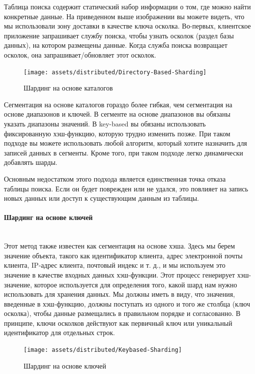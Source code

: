 Таблица поиска содержит статический набор информации о том, где можно найти конкретные данные. На приведенном выше
изображении вы можете видеть, что мы использовали зону доставки в качестве ключа осколка. Во-первых, клиентское
приложение запрашивает службу поиска, чтобы узнать осколок (раздел базы данных), на котором размещены данные. Когда
служба поиска возвращает осколок, она запрашивает/обновляет этот осколок.

\begin{figure}[H]
    \centering
    \texttt{[image: assets/distributed/Directory-Based-Sharding]}
    \caption{Шардинг на основе каталогов}
    \label{fig:Directory-Based-Sharding}
\end{figure}

Сегментация на основе каталогов гораздо более гибкая, чем сегментация на основе диапазонов и ключей. В сегменте на
основе диапазонов вы обязаны указать диапазоны значений. В key-based вы обязаны использовать фиксированную хэш-функцию,
которую трудно изменить позже. При таком подходе вы можете использовать любой алгоритм, который хотите назначить для
записей данных в сегменты. Кроме того, при таком подходе легко динамически добавлять шарды.

Основным недостатком этого подхода является единственная точка отказа таблицы поиска. Если он будет поврежден или не
удался, это повлияет на запись новых данных или доступ к существующим данным из таблицы. \autocite{DatabaseSharding}

\paragraph{Шардинг на основе ключей} ~\\
Этот метод также известен как сегментация на основе хэша. Здесь мы берем значение объекта, такого как идентификатор
клиента, адрес электронной почты клиента, IP-адрес клиента, почтовый индекс и т. д., и мы используем это значение в
качестве входных данных хэш-функции. Этот процесс генерирует хэш-значение, которое используется для определения того,
какой шард нам нужно использовать для хранения данных. Мы должны иметь в виду, что значения, введенные в хэш-функцию,
должны поступать из одного и того же столбца (ключ осколка), чтобы данные размещались в правильном порядке и
согласованно. В принципе, ключи осколков действуют как первичный ключ или уникальный идентификатор для отдельных строк.

\begin{figure}[H]
    \centering
    \texttt{[image: assets/distributed/Keybased-Sharding]}
    \caption{Шардинг на основе ключей}
    \label{fig:Keybased-Sharding}
\end{figure}

